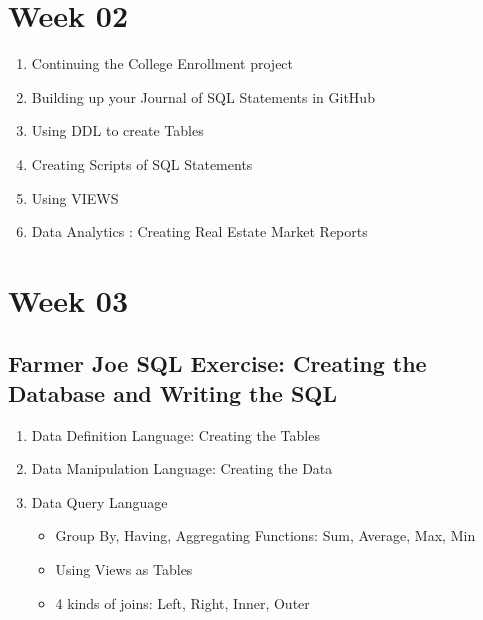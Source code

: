 \section * {Week 02}
    
\begin{enumerate}
    \item Continuing the College Enrollment project
    \item Building up your Journal of SQL Statements in GitHub
     \item Using DDL to create Tables   
     \item Creating Scripts of SQL Statements   
     \item Using VIEWS
      \item Data Analytics : Creating Real Estate Market Reports
\end{enumerate}

\section * {Week 03}
\subsection * {Farmer Joe SQL Exercise: Creating the Database and Writing the SQL}
\begin{enumerate}
    \item Data Definition Language: Creating the Tables
    \item Data Manipulation Language: Creating the Data
    \item Data Query Language
    \begin{itemize}
        \item Group By, Having, Aggregating Functions: Sum, Average, Max, Min 
        \item Using Views as Tables
        \item 4 kinds of joins: Left, Right, Inner, Outer
    \end{itemize} 
\end{enumerate}
    